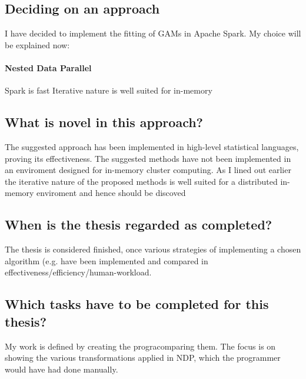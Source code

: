 \documentclass{article}
\begin{document}
    \subsection{Deciding on an approach}

    I have decided to implement the fitting of GAMs in Apache Spark. My choice will be explained now:
    \paragraph{Nested Data Parallel}
        Spark is fast
        Iterative nature is well suited for in-memory



    \subsection{What is novel in this approach?}
    The suggested approach has been implemented in high-level statistical languages, proving its effectiveness. The suggested methods have not been implemented in an enviroment designed for in-memory cluster computing. As I lined out earlier the iterative nature of the proposed methods is well suited for a distributed in-memory enviroment and hence should be discoved

    \subsection{When is the thesis regarded as completed?}
    The thesis is considered finished, once various strategies of
    implementing a chosen algorithm (e.g.  have been
    implemented and compared in effectiveness/efficiency/human-workload.

    \subsection{Which tasks have to be completed for this thesis?}
    My work is defined by creating the progracomparing them.
    The focus is on showing the various transformations applied in NDP, which the programmer would have had done manually.
\end{document}
